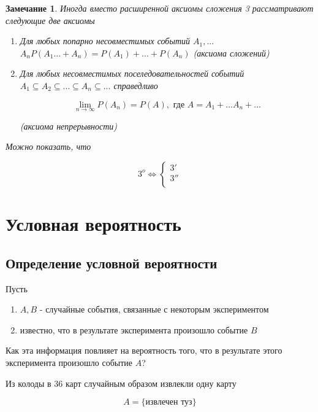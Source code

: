 \documentclass[a4paper, 14pt]{report}
\newtheorem{note}{Замечание}[section]
\begin{document}
\begin{note}
    Иногда вместо расширенной аксиомы сложения 3 рассматривают следующие две аксиомы

    \begin{enumerate}
        \item[3')] Для любых попарно несовместимых событий $A_1,...$ $A_n P(A_1...+A_n) = P(A_1) + ... + P(A_n)$ (аксиома сложений)

        \item[3'')] Для любых несовместимых поселедовательностей событий $A_1 \subseteq A_2 \subseteq ... \subseteq A_n \subseteq ...$ справедливо

            $$
            \lim_{n \to \infty} P(A_n) = P(A), \text{ где } A = A_1 + ... A_n + ...
            $$

            (аксиома непрерывности)
    \end{enumerate}

    Можно показать, что

    $$
    3^o \Leftrightarrow
    \begin{cases}
        3' \\
        3'' \\
    \end{cases}
    $$
\end{note}

\chapter{Условная вероятность}

\section{Определение условной вероятности}

Пусть 

\begin{enumerate}
    \item $A, B$ - случайные события, связанные с некоторым экспериментом
    \item известно, что в результате эксперимента произошло событие $B$ 
\end{enumerate}

Как эта информация повлияет на вероятность того, что в результате этого эксперимента произошло событие $A$?

Из колоды в 36 карт случайным образом извлекли одну карту

$$
A = \{ \text{извлечен туз} \}
$$
\end{document}
